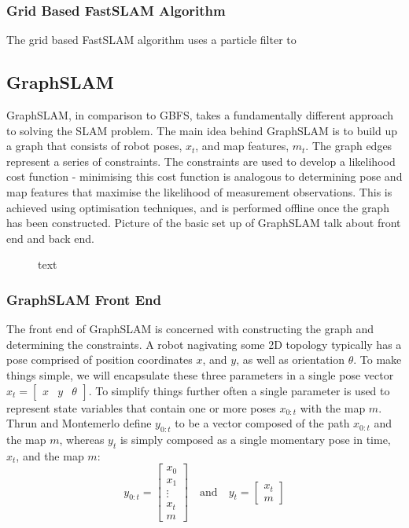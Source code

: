 \documentclass[a4paper]{article}
\begin{document}
\subsubsection{Grid Based FastSLAM Algorithm}
The grid based FastSLAM algorithm uses a particle filter to 


\subsection{GraphSLAM}
GraphSLAM, in comparison to GBFS, takes a fundamentally different approach to solving the SLAM problem. The main idea behind GraphSLAM is to build up a graph that consists of robot poses, $x_t$, and map features, $m_t$. The graph edges represent a series of constraints. The constraints are used to develop a likelihood cost function - minimising this cost function is analogous to determining pose and map features that maximise the likelihood of measurement observations. This is achieved using optimisation techniques, and is performed offline once the graph has been constructed. Picture of the basic set up of GraphSLAM talk about front end and back end.
\begin{figure}[h]
\centering
\caption{text}
\end{figure}


\subsubsection{GraphSLAM Front End}
The front end of GraphSLAM is concerned with constructing the graph and determining the constraints. A robot nagivating some 2D topology typically has a pose comprised of position coordinates $x$, and $y$, as well as orientation $\theta$. To make things simple, we will encapsulate these three parameters in a single pose vector $x_t = \begin{bmatrix} x & y & \theta \end{bmatrix}$. To simplify things further often a single parameter is used to represent state variables that contain one or more poses $x_{0:t}$ with the map $m$. Thrun and Montemerlo define $y_{0:t}$ to be a vector composed of the path $x_{0:t}$ and the map $m$, whereas $y_t$ is simply composed as a single momentary pose in time, $x_t$, and the map $m$:
\begin{equation}
y_{0:t} =
\begin{bmatrix}
x_0 \\ x_1 \\ \vdots \\ x_t \\ m
\end{bmatrix}
\quad\mathrm{and}\quad 
y_t =
\begin{bmatrix}
x_t \\ m
\end{bmatrix}
\end{equation}
\end{document}
